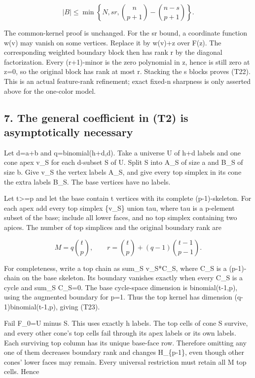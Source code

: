 \[
|B|\le\min\left\{N,sr,
         \binom n{p+1}-\binom{n-s}{p+1}\right\}.
 \tag{T22}
\]

The common-kernel proof is unchanged. For the sr bound, a coordinate function w(v) may vanish on some vertices. Replace it by w(v)+z over F(z). The corresponding weighted boundary block then has rank r by the diagonal factorization. Every (r+1)-minor is the zero polynomial in z, hence is still zero at z=0, so the original block has rank at most r. Stacking the s blocks proves (T22). This is an actual feature-rank refinement; exact fixed-n sharpness is only asserted above for the one-color model.

\hypertarget{af-3f6acd6e5b-the-general-coefficient-in-t2-is-asymptotically-necessary}{%
\subsection{7. The general coefficient in (T2) is asymptotically necessary}\label{af-3f6acd6e5b-the-general-coefficient-in-t2-is-asymptotically-necessary}}

Let d=a+b and q=binomial(h+d,d). Take a universe U of h+d labels and one cone apex v\_S for each d-subset S of U. Split S into A\_S of size a and B\_S of size b. Give v\_S the vertex labels A\_S, and give every top simplex in its cone the extra labels B\_S. The base vertices have no labels.

Let t\textgreater=p and let the base contain t vertices with its complete (p-1)-skeleton. For each apex add every top simplex \{v\_S\} union tau, where tau is a p-element subset of the base; include all lower faces, and no top simplex containing two apices. The number of top simplices and the original boundary rank are

\[
M=q\binom tp,\qquad
 r=\binom tp+(q-1)\binom{t-1}{p-1}.
 \tag{T23}
\]

For completeness, write a top chain as sum\_S v\_S*C\_S, where C\_S is a (p-1)-chain on the base skeleton. Its boundary vanishes exactly when every C\_S is a cycle and sum\_S C\_S=0. The base cycle-space dimension is binomial(t-1,p), using the augmented boundary for p=1. Thus the top kernel has dimension (q-1)binomial(t-1,p), giving (T23).

Fail F\_0=U minus S. This uses exactly h labels. The top cells of cone S survive, and every other cone's top cells fail through its apex labels or its own labels. Each surviving top column has its unique base-face row. Therefore omitting any one of them decreases boundary rank and changes H\_\{p-1\}, even though other cones' lower faces may remain. Every universal restriction must retain all M top cells. Hence

